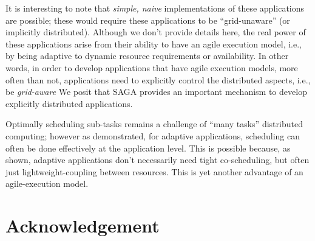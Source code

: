 \documentclass{llncs}
\begin{document}

It is interesting to note that {\it simple, naive} implementations of
these applications are possible; these would require these
applications to be ``grid-unaware'' (or implicitly distributed).
Although we don't provide details here, the real power of these
applications arise from their ability to have an agile execution
model, i.e., by being adaptive to dynamic resource requirements or
availability. In other words, in order to develop applications that
have agile execution models, more often than not, applications need to
explicitly control the distributed aspects, i.e., be {\it grid-aware}
We posit that SAGA provides an important mechanism to develop
explicitly distributed applications.


Optimally scheduling sub-tasks remains a challenge of ``many tasks''
distributed computing; however as demonstrated, for adaptive
applications, scheduling can often be done effectively at the
application level.  This is possible because, as shown, adaptive
applications don't necessarily need tight co-scheduling, but often
just lightweight-coupling between resources. This is yet another
advantage of an agile-execution model.



\up\upp

\section*{Acknowledgement}
\end{document}
